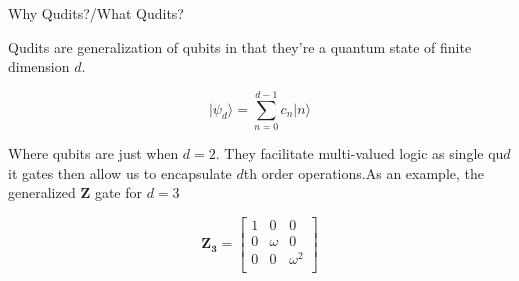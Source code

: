 \documentclass[xcolor=dvipsnames]{beamer}
\begin{document}
\begin{frame}{Why Qudits?/What Qudits?}

Qudits are generalization of qubits in that they're a quantum state of finite dimension $d$.\pause

$$
\vert\psi_d\rangle=\sum_{n=0}^{d-1}c_{n}\vert n \rangle
$$

Where qubits are just when $d=2$. \pause They facilitate multi-valued logic as single qu$d$it gates then allow us to encapsulate $d$th order operations.\pause As an example, the generalized $\mathbf{Z}$ gate for $d=3$

$$
\mathbf{Z_3}=\begin{bmatrix}
1 & 0 & 0\\
0 & \omega & 0 \\
0 & 0 & \omega^2\\
\end{bmatrix}
$$

\end{frame}
\end{document}
